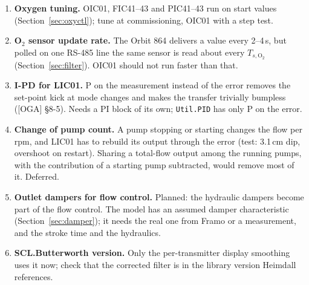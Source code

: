 \documentclass[11pt]{article}
\begin{document}
\begin{enumerate}
        port, unit id 0, command and reference channel on Ethernet (Fr1, Cd1), and the
        communication-loss fault (CnF) active, so the pump stops when the PLC is lost.
  \item \textbf{Oxygen tuning.} OIC01, FIC41--43 and PIC41--43 run on start values
        (Section~\ref{sec:oxyctl}); tune at commissioning, OIC01 with a step test.
  \item \textbf{O$_2$ sensor update rate.} The Orbit 864 delivers a value every 2--4\,s, but
        polled on one RS-485 line the same sensor is read about every $T_{s,\text{O}_2}$
        (Section~\ref{sec:filter}). OIC01 should not run faster than that.
  \item \textbf{I-PD for LIC01.} P on the measurement instead of the error removes the set-point
        kick at mode changes and makes the transfer trivially bumpless ([OGA] §8-5). Needs a PI
        block of its own; \texttt{Util.PID} has only P on the error.
  \item \textbf{Change of pump count.} A pump stopping or starting changes the flow per rpm, and
        LIC01 has to rebuild its output through the error (test: 3.1\,cm dip, overshoot on
        restart). Sharing a total-flow output among the running pumps, with the contribution of a
        starting pump subtracted, would remove most of it. Deferred.
  \item \textbf{Outlet dampers for flow control.} Planned: the hydraulic dampers become part of
        the flow control. The model has an assumed damper characteristic (Section~\ref{sec:damper});
        it needs the real one from Framo or a measurement, and the stroke time and the hydraulics.
  \item \textbf{SCL.Butterworth version.} Only the per-transmitter display smoothing uses it now;
        check that the corrected filter is in the library version Heimdall references.
\end{enumerate}
\end{document}

